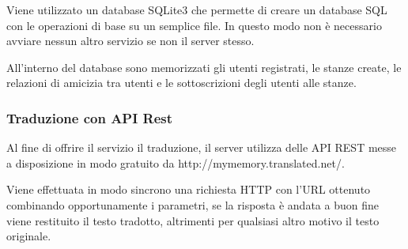 Viene utilizzato un database SQLite3 che permette di creare un database SQL con le operazioni di base su un semplice file. In questo modo non è necessario avviare nessun altro servizio se non il server stesso.

All'interno del database sono memorizzati gli utenti registrati, le stanze create, le relazioni di amicizia tra utenti e le sottoscrizioni degli utenti alle stanze.

\subsubsection{Traduzione con API Rest}
Al fine di offrire il servizio il traduzione, il server utilizza delle API REST messe a disposizione in modo gratuito da http://mymemory.translated.net/.

Viene effettuata in modo sincrono una richiesta HTTP con l'URL ottenuto combinando opportunamente i parametri, se la risposta è andata a buon fine viene restituito il testo tradotto, altrimenti per qualsiasi altro motivo il testo originale.